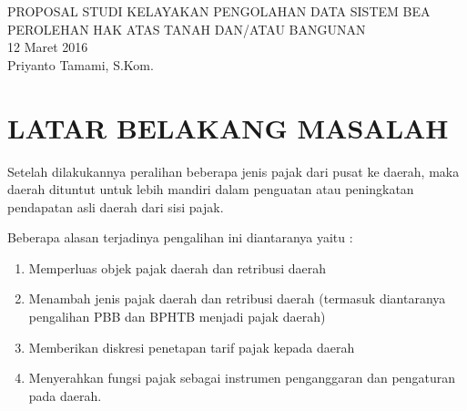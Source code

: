 \documentclass[pdftex,12pt, oneside]{article}
\begin{document}

%
\begin{center}
{\large PROPOSAL STUDI KELAYAKAN PENGOLAHAN DATA SISTEM BEA PEROLEHAN HAK ATAS TANAH DAN/ATAU BANGUNAN}
\\[1cm]
12 Maret 2016\\
Priyanto Tamami, S.Kom.
\end{center}


%
%

% 


%
%
%
%

%
%
%
% 
% 
% 

%
%


\section{LATAR BELAKANG MASALAH}

Setelah dilakukannya peralihan beberapa jenis pajak dari pusat ke daerah, maka daerah dituntut untuk lebih mandiri dalam penguatan atau peningkatan pendapatan asli daerah dari sisi pajak.

Beberapa alasan terjadinya pengalihan ini diantaranya yaitu :

\begin{enumerate}[1.]
  \item Memperluas objek pajak daerah dan retribusi daerah
  \item Menambah jenis pajak daerah dan retribusi daerah (termasuk diantaranya pengalihan PBB dan BPHTB menjadi pajak daerah)
  \item Memberikan diskresi penetapan tarif pajak kepada daerah
  \item Menyerahkan fungsi pajak sebagai instrumen penganggaran dan pengaturan pada daerah.
\end{enumerate}
\end{document}
